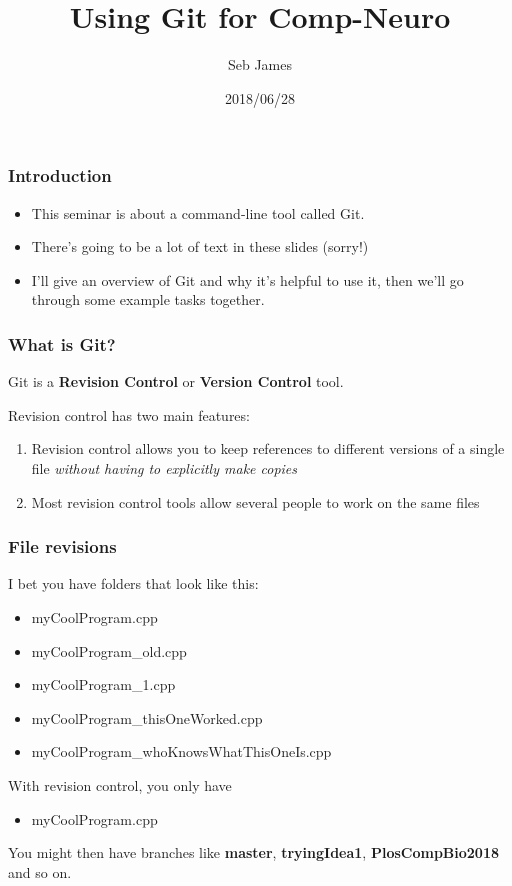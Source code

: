 \documentclass{beamer}
\title{Using Git for Comp-Neuro}
\author{Seb James}
\institute{ABRG Sheffield Internal Seminar}
\date{2018/06/28}
\begin{document}
\begin{frame}
  \titlepage %
\end{frame}

\begin{frame}
  \frametitle{Introduction}
  \begin{itemize}
    \item This seminar is about a command-line tool called Git.

    \item There's going to be a lot of \alert{text} in these slides (sorry!)

    \item I'll give an overview of Git and why it's helpful to use it, then we'll go
      through some example tasks together.
  \end{itemize}
\end{frame}

\begin{frame}
  \frametitle{What is Git?}
  Git is a \textbf{Revision Control} or \textbf{Version Control} tool.

  Revision control has two main features:

  \begin{enumerate}
    \pause \item Revision control allows you to keep references to different versions of a
      single file \emph{without having to explicitly make copies}
      \pause \item Most revision control tools allow several people to work
      on the same files %
  \end{enumerate}
\end{frame}

\begin{frame}
  \frametitle{File revisions}
  I bet you have folders that look like this:
  \pause \begin{itemize}
      \item myCoolProgram.cpp
      \pause \item myCoolProgram\_old.cpp
      \pause \item myCoolProgram\_1.cpp
      \pause \item myCoolProgram\_thisOneWorked.cpp
      \item myCoolProgram\_whoKnowsWhatThisOneIs.cpp
  \end{itemize}
  \pause With revision control, you only have
  \begin{itemize}
  \item myCoolProgram.cpp
  \end{itemize}
  \pause You might then have \alert{branches} like \textbf{master},
  \textbf{tryingIdea1}, \textbf{PlosCompBio2018} and so on.
\end{frame}
\end{document}
